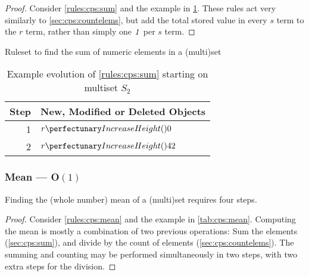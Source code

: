 \begin{proof}
Consider \cref{rules:cps:sum} and the example in \cref{tab:cps:sum}.  These rules act very similarly to \cref{sec:cps:countelems}, but add the total stored value in every \(s\) term to the \(r\) term, rather than simply one \(\mathit{1}\) per \(s\) term.
\end{proof}

\begin{cprulesetfloat} \begin{cpruleset}
\end{cpruleset}
\caption{\label{rules:cps:sum}Ruleset to find the sum of numeric elements in a (multi)set}
\end{cprulesetfloat}

\begin{table} \centering
   \begin{tabular}{|r|l|}
    \hline
    \textbf{Step} & \textbf{New, Modified or Deleted Objects} \\ \hline
    1 & \(\cpfunc{r}{0}\)\\ \hline
    2 & \(\cpfunc{r}{42}\)\\ \hline

\end{tabular}
\caption[Example evolution of \cref{rules:cps:sum}]{\label{tab:cps:sum}Example evolution of \cref{rules:cps:sum} starting on multiset \(S_2\)}
\end{table}

\subsubsection{Mean --- O\((1)\)}\label{sec:cps:mean}

\begin{proposition}\label{prop:cps:mean}
Finding the (whole number) mean of a (multi)set requires four steps.
\end{proposition}

\begin{proof}
Consider \cref{rules:cps:mean} and the example in \cref{tab:cps:mean}.  Computing the mean is mostly a combination of two previous operations:  Sum the elements (\cref{sec:cps:sum}), and divide by the count of elements (\cref{sec:cps:countelems}).  The summing and counting may be performed simultaneously in two steps, with two extra steps for the division.
\end{proof}

